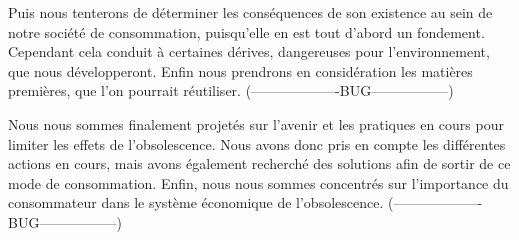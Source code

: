 	Puis nous tenterons de déterminer les conséquences de son existence au sein de notre société de consommation, puisqu'elle en est tout d'abord un fondement. Cependant cela conduit à certaines dérives, dangereuses pour l'environnement, que nous développeront. Enfin nous prendrons en considération les matières premières, que l'on pourrait réutiliser. (-------------------BUG-----------------)

	Nous nous sommes finalement projetés sur l'avenir et les pratiques en cours pour limiter les effets de l'obsolescence. Nous avons donc pris en compte les différentes actions en cours, mais avons également recherché des solutions afin de sortir de ce mode de consommation. Enfin, nous nous sommes concentrés sur l'importance du consommateur dans le système économique de l'obsolescence. (-------------------BUG-----------------)

	


